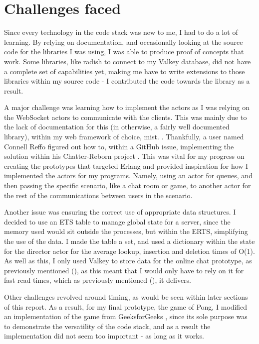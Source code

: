 \documentclass[]{final}
\begin{document}
\section{Challenges faced}

Since every technology in the code stack was new to me, I had to do a lot of learning.
By relying on documentation, and occasionally looking at the source code for
the libraries I was using, I was able to produce proof of concepts that work.
Some libraries, like radish to connect to my Valkey database, did not have
a complete set of capabilities yet, making me have to write extensions to those
libraries within my source code - I contributed the code towards the
library as a result.%

A major challenge was learning how to implement the actors as I was relying on
the WebSocket actors to communicate with the clients. This was mainly due to the
lack of documentation for this (in otherwise, a fairly well documented library),
within my web framework of choice, mist. \cite{noauthor_example_nodate}.
Thankfully, a user named Connell Reffo figured out how to, within a GitHub issue,
implementing the solution within his Chatter-Reborn project \cite{reffo_connellr023/chatter-reborn_2024}.
This was vital for my progress on creating the prototypes that targeted Erlang and
provided inspiration for how I implemented the actors for my programs. Namely,
using an actor for queues, and then passing the specific scenario, like a chat
room or game, to another actor for the rest of the communications
between users in the scenario.

Another issue was ensuring the correct use of appropriate data structures.
I decided to use an ETS table to manage global state for a server, since the
memory used would sit outside the processes, but within the ERTS, simplifying
the use of the data. I made the table a set, and used a dictionary within the
state for the director actor for the average lookup, insertion and deletion
times of O(1). As well as this, I only used Valkey to store data for the
online chat prototype, as previously mentioned {\hypersetup{linkcolor=teal}(\pageref{valkeyMessageBroker})}, as this meant that I would
only have to rely on it for fast read times, which as previously mentioned {\hypersetup{linkcolor=teal}(\pageref{valkeyRead})},
it delivers.

Other challenges revolved around timing, as would be seen within later sections
of this report. As a result, for my final prototype, the game of Pong, I
modified an implementation of the game from GeeksforGeeks \cite{GeeksforGeeks_pong_2021}, since its sole
purpose was to demonstrate the versatility of the code stack, and as a result
the implementation did not seem too important - as long as it works.
\end{document}
